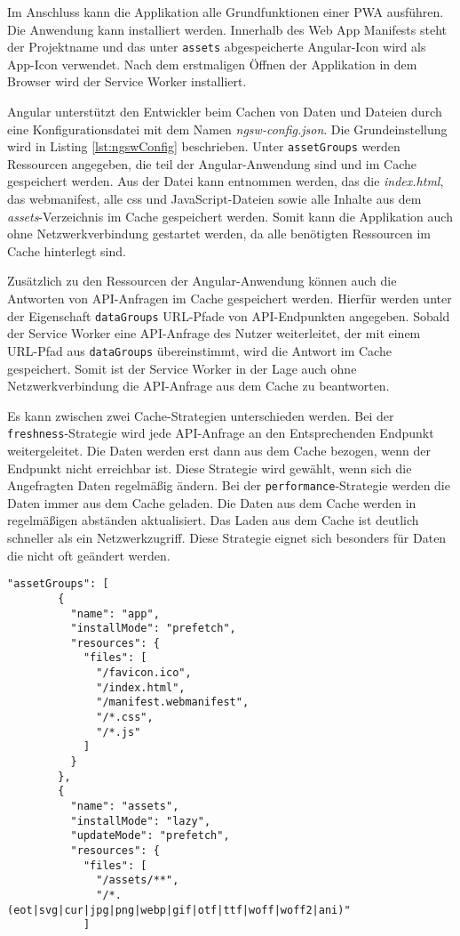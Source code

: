 Im Anschluss kann die Applikation alle Grundfunktionen einer PWA ausführen. Die Anwendung kann installiert werden. Innerhalb des Web App Manifests steht der Projektname und das unter \texttt{assets} abgespeicherte Angular-Icon wird als App-Icon verwendet. Nach dem erstmaligen Öffnen der Applikation in dem Browser wird der Service Worker installiert. 

Angular unterstützt den Entwickler beim Cachen von Daten und Dateien durch eine Konfigurationsdatei mit dem Namen \textit{ngsw-config.json}. Die Grundeinstellung wird in Listing \ref{lst:ngswConfig} beschrieben. Unter \texttt{assetGroups} werden Ressourcen angegeben, die teil der Angular-Anwendung sind und im Cache gespeichert werden. Aus der Datei kann entnommen werden, das die \textit{index.html}, das webmanifest, alle css und JavaScript-Dateien sowie alle Inhalte aus dem \textit{assets}-Verzeichnis im Cache gespeichert werden. 
Somit kann die Applikation auch ohne Netzwerkverbindung gestartet werden, da alle benötigten Ressourcen im Cache hinterlegt sind. 

Zusätzlich zu den Ressourcen der Angular-Anwendung können auch 
die Antworten von API-Anfragen im Cache gespeichert werden.
Hierfür werden unter der Eigenschaft \texttt{dataGroups} URL-Pfade von API-Endpunkten angegeben. Sobald der Service Worker eine API-Anfrage des Nutzer weiterleitet, der mit einem URL-Pfad aus \texttt{dataGroups} übereinstimmt, wird die Antwort im Cache gespeichert. 
Somit ist der Service Worker in der Lage auch ohne Netzwerkverbindung die API-Anfrage aus dem Cache zu beantworten. 

Es kann zwischen zwei Cache-Strategien unterschieden werden.
Bei der \texttt{freshness}-Strategie wird jede API-Anfrage an den Entsprechenden Endpunkt weitergeleitet. 
Die Daten werden erst dann aus dem Cache bezogen, wenn der Endpunkt nicht erreichbar ist. Diese Strategie wird gewählt, wenn sich die Angefragten Daten regelmäßig ändern. 
Bei der \texttt{performance}-Strategie werden die Daten immer aus dem Cache geladen. Die Daten aus dem Cache werden in regelmäßigen abständen aktualisiert. Das Laden aus dem Cache ist deutlich schneller als ein Netzwerkzugriff. Diese Strategie eignet sich besonders für Daten die nicht oft geändert werden. 

\begin{lstlisting}[caption={Angular \textit{ngsw-config.json}-Datei zur Angabe der Ressourcen, die durch den Service Worker in den Cache gespeichert werden sollen}, label=lst:ngswConfig, float=!htb ]
    "assetGroups": [
        {
          "name": "app",
          "installMode": "prefetch",
          "resources": {
            "files": [
              "/favicon.ico",
              "/index.html",
              "/manifest.webmanifest",
              "/*.css",
              "/*.js"
            ]
          }
        },
        {
          "name": "assets",
          "installMode": "lazy",
          "updateMode": "prefetch",
          "resources": {
            "files": [
              "/assets/**",
              "/*.(eot|svg|cur|jpg|png|webp|gif|otf|ttf|woff|woff2|ani)"
            ] 
\end{lstlisting}







